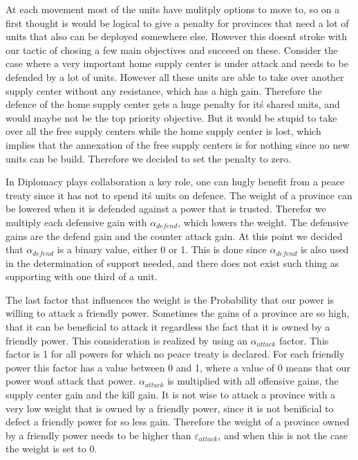 \documentclass[a4paper]{article} %
\begin{document}
At each movement most of the units have mulitply options to move to, so on a first thought is would be logical to give a penalty for provinces that need a lot of units that also can be deployed somewhere else. However this doesn\'t stroke with our tactic of chosing a few main objectives and succeed on these. Consider the case where a very important home supply center is under attack and needs to be defended by a lot of units. However all these units are able to take over another supply center without any resistance, which has a high gain. Therefore the defence of the home supply center gets a huge penalty for it\'s shared units, and would maybe not be the top priority objective. But it would be stupid to take over all the free supply centers while the home supply center is lost, which implies that the annexation of the free supply centers is for nothing since no new units can be build. Therefore we decided to set the penalty to zero. 

In Diplomacy plays collaboration a key role, one can hugly benefit from a peace treaty since it has not to spend it\'s units on defence. The weight of a province can be lowered when it is defended against a power that is trusted. Therefor we multiply each defensive gain with $\alpha_{defend}$, which lowers the weight. The defensive gains are the defend gain and the counter attack gain. At this point we decided that $\alpha_{defend}$ is a binary value, either 0 or 1. This is done since $\alpha_{defend}$ is also used in the determination of support needed, and there does not exist such thing as supporting with one third of a unit. 

The last factor that influences the weight is the Probability that our power is willing to attack a friendly power. Sometimes the gains of a province are so high, that it can be beneficial to attack it regardless the fact that it is owned by a friendly power. This consideration is realized by using an $\alpha_{attack}$ factor. This factor is 1 for all powers for which no peace treaty is declared. For each friendly power this factor has a value between 0 and 1, where a value of 0 means that our power won\'t attack that power. $\alpha_{attack}$ is multiplied with all offensive gains, the supply center gain and the kill gain. It is not wise to attack a province with a very low weight that is owned by a friendly power, since it is not benificial to defect a friendly power for so less gain. Therefore the weight of a province owned by a friendly power needs to be higher than $\varepsilon_{attack}$, and when this is not the case the weight is set to 0. 
\end{document}

